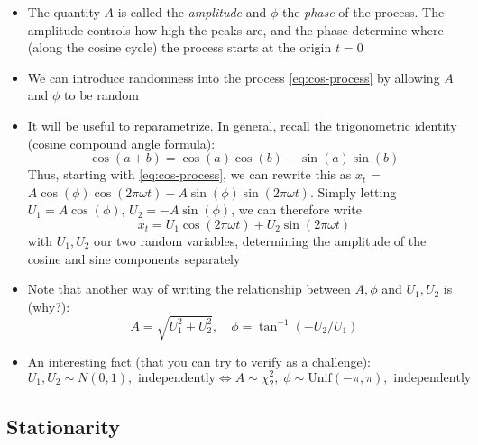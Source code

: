 \documentclass{article}
\begin{document}
\begin{itemize}
\item The quantity $A$ is called the \emph{amplitude} and $\phi$ the
  \emph{phase} of the process. The amplitude controls how high the peaks are, 
  and the phase determine where (along the cosine cycle) the process starts at
  the origin $t=0$   

\item We can introduce randomness into the process \eqref{eq:cos-process} by
  allowing $A$ and $\phi$ to be random

\item It will be useful to reparametrize. In general, recall the trigonometric
  identity (cosine compound angle formula):
  \begin{equation}
  \label{eq:compound-angle}
  \cos(a + b) = \cos(a) \cos(b) - \sin(a) \sin(b)
  \end{equation}
  Thus, starting with \eqref{eq:cos-process}, we can rewrite this as $x_t$ = $A
  \cos(\phi) \cos(2\pi\omega t) - A \sin(\phi) \sin(2\pi\omega t)$. Simply
  letting $U_1 = A \cos(\phi)$, $U_2 = -A \sin(\phi)$, we can therefore write   
  \begin{equation}
  \label{eq:cos-sin-process}
  x_t = U_1 \cos(2\pi\omega t) + U_2 \sin(2\pi\omega t)
  \end{equation}
  with $U_1, U_2$ our two random variables, determining the amplitude of the
  cosine and sine components separately

\item Note that another way of writing the relationship between $A,\phi$ and
  $U_1,U_2$ is (why?):
  \[
  A = \sqrt{U_1^2 + U_2^2}, \quad \phi = \tan^{-1}(-U_2/U_1)
  \]

  \item An interesting fact (that you can try to verify as a challenge): 
  \[
  U_1,U_2 \sim N(0,1), \text{ independently} \iff 
  A \sim \chi^2_2, \; \phi \sim \mathrm{Unif}(-\pi,\pi), \text{ independently} 
  \]
\end{itemize}

\subsection{Stationarity}
\end{document}

